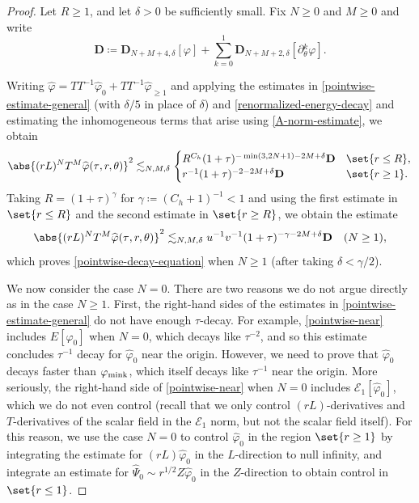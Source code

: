 \documentclass[10pt, reqno]{amsart}
\begin{document}
\begin{proof}
Let \(R\ge 1\), and let \(\delta{} > 0\) be sufficiently small. Fix \(N\ge 0\) and \(M\ge 0\)
and write
\begin{equation}
\mathbf{D} \coloneqq{}\mathbf{D}_{N+M+4,\delta{}}[\varphi{}] + \sum_{k=0}^1\mathbf{D}_{N+M+2,\delta{}}[\partial{}_\theta^k\varphi{}].
\end{equation}

 Writing \(\widehat{\varphi{}} =
TT^{-1}\widehat{\varphi{}}_0 + TT^{-1}\widehat{\varphi{}}_{\ge 1}\) and applying
the estimates in \cref{pointwise-estimate-general} (with \(\delta{}/5\) in place of
\(\delta{}\)) and \cref{renormalized-energy-decay} and estimating the inhomogeneous
terms that arise using \cref{A-norm-estimate}, we obtain
\begin{equation}\label{pointwise-decay-equation-prep}
\abs{(rL)^NT^M\widehat{\varphi{}}(\tau{},r,\theta{})}^2\lesssim_{N,M,\delta{}} \begin{cases}
R^{C_h}(1+\tau{})^{-\min (3,2N+1)-2M+\delta{}}\mathbf{D} & \set{r\le R},\\
r^{-1}(1+\tau{})^{-2-2M+\delta{}}\mathbf{D} &\set{r\ge 1}.\
\end{cases}
\end{equation}
Taking \(R = (1+\tau{})^\gamma{}\) for \(\gamma{} \coloneqq{} (C_h + 1)^{-1}<1\) and using the first
estimate in \(\set{r\le R}\) and the second estimate in \(\set{r\ge R}\), we
obtain the estimate
\begin{equation}\label{pointwise-decay-prep}
\abs{(rL)^NT^M\widehat{\varphi{}}(\tau{},r,\theta{})}^2\lesssim_{N,M,\delta{}} u^{-1}v^{-1}(1+\tau)^{-\gamma{}-2M+\delta{}}\mathbf{D}\quad(N\ge 1),
\end{equation}
which proves \cref{pointwise-decay-equation} when \(N\ge 1\) (after taking \(\delta{} <
\gamma{}/2\)).

 We now consider the case \(N = 0\). There are two
reasons we do not argue directly as in the case \(N\ge 1\). First, the
right-hand sides of the estimates in \cref{pointwise-estimate-general} do not have
enough \(\tau{}\)-decay. For example, \cref{pointwise-near} includes
\(E[\widehat{\varphi{}}_0]\) when \(N = 0\), which decays like \(\tau^{-2}\),
and so this estimate concludes \(\tau^{-1}\) decay for \(\widehat{\varphi{}}_0\)
near the origin. However, we need to prove that \(\widehat{\varphi{}}_0\) decays
faster than \(\varphi{}_{\textnormal{mink}}\), which itself decays like
\(\tau^{-1}\) near the origin. More seriously, the right-hand side of
\cref{pointwise-near} when \(N = 0\) includes
\(\mathcal{E}_1[\widehat{\varphi{}}_0]\), which we do not even control (recall
that we only control \((rL)\)-derivatives and \(T\)-derivatives of the scalar
field in the \(\mathcal{E}_1\) norm, but not the scalar field itself). For this
reason, we use the case \(N = 0\) to control \(\widehat{\varphi{}}_0\) in the
region \(\set{r\ge 1}\) by integrating the estimate for
\((rL)\widehat{\varphi{}}_0\) in the \(L\)-direction to null infinity, and
integrate an estimate for \(\widehat{\Psi{}}_0 \sim r^{1/2}Z\widehat{\varphi{}}_0\) in the
\(Z\)-direction to obtain control in \(\set{r\le 1}\).


\end{proof}
\end{document}
